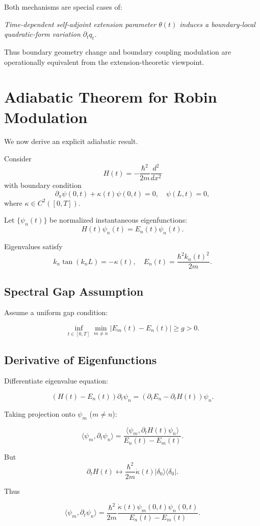 \documentclass[11pt,a4paper]{article}
\begin{document}
Both mechanisms are special cases of:

\medskip
\emph{Time-dependent self-adjoint extension parameter
$\theta(t)$ induces a boundary-local quadratic-form variation
$\partial_t q_t$.}
\medskip

Thus boundary geometry change and boundary coupling modulation
are operationally equivalent from the extension-theoretic viewpoint.

\section{Adiabatic Theorem for Robin Modulation}

We now derive an explicit adiabatic result.

Consider
\[
H(t) = -\frac{\hbar^2}{2m}\frac{d^2}{dx^2}
\]
with boundary condition
\[
\partial_x\psi(0,t)+\kappa(t)\psi(0,t)=0,
\quad \psi(L,t)=0,
\]
where $\kappa \in C^2([0,T])$.

Let $\{\psi_n(t)\}$ be normalized instantaneous eigenfunctions:
\[
H(t)\psi_n(t) = E_n(t)\psi_n(t).
\]

Eigenvalues satisfy
\[
k_n \tan(k_n L) = -\kappa(t),
\quad
E_n(t)=\frac{\hbar^2 k_n(t)^2}{2m}.
\]

\subsection{Spectral Gap Assumption}

Assume a uniform gap condition:

\[
\inf_{t\in[0,T]}
\min_{m\neq n}
|E_m(t)-E_n(t)|
\ge g >0.
\]

\subsection{Derivative of Eigenfunctions}

Differentiate eigenvalue equation:

\[
(H(t)-E_n(t))\partial_t\psi_n
=
(\partial_t E_n - \partial_t H(t))\psi_n.
\]

Taking projection onto $\psi_m$ ($m\neq n$):

\[
\langle \psi_m,\partial_t \psi_n\rangle
=
\frac{
\langle \psi_m,\partial_t H(t)\psi_n\rangle
}{
E_n(t)-E_m(t)
}.
\]

But
\[
\partial_t H(t)
\leftrightarrow
\frac{\hbar^2}{2m}\dot\kappa(t)
|\delta_0\rangle\!\langle \delta_0|.
\]

Thus

\[
\langle \psi_m,\partial_t \psi_n\rangle
=
\frac{\hbar^2}{2m}
\frac{
\dot\kappa(t)
\psi_m(0,t)\psi_n(0,t)
}{
E_n(t)-E_m(t)
}.
\]
\end{document}

